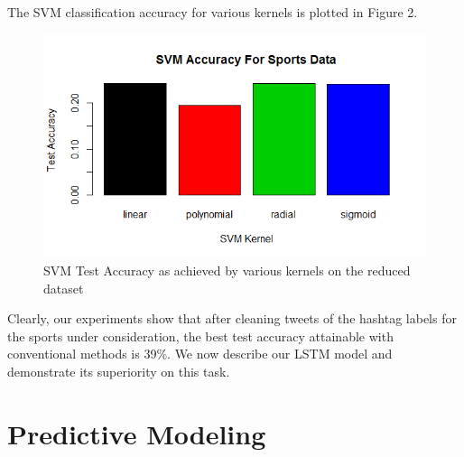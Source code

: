\documentclass[journal, a4paper]{IEEEtran}
\begin{document}
The SVM classification accuracy for various kernels is plotted in Figure 2.
\begin{figure}[!hbt]
	\centering
	\includegraphics[width=\columnwidth]{compare.png}
	\caption{SVM Test Accuracy as achieved by various kernels on the reduced dataset}
	\label{fig:2}
\end{figure}

Clearly, our experiments show that after cleaning tweets of the hashtag labels for the sports under consideration, the best test accuracy attainable with conventional methods is 39\%. We now describe our LSTM model and demonstrate its superiority on this task.

\section{Predictive Modeling}
\end{document}

